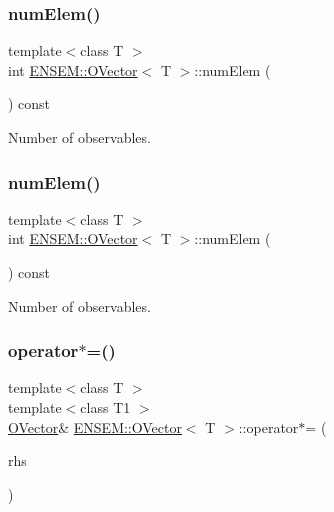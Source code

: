 \subsubsection{\texorpdfstring{numElem()}{numElem()}\hspace{0.1cm}{\footnotesize\ttfamily [2/3]}}
{\footnotesize\ttfamily template$<$class T $>$ \\
int \mbox{\hyperlink{classENSEM_1_1OVector}{E\+N\+S\+E\+M\+::\+O\+Vector}}$<$ T $>$\+::num\+Elem (\begin{DoxyParamCaption}{ }\end{DoxyParamCaption}) const\hspace{0.3cm}{\ttfamily [inline]}}



Number of observables. 

\mbox{\label{classENSEM_1_1OVector_a77771968912766dab2f1bd6ed7ccc876}} 
\subsubsection{\texorpdfstring{numElem()}{numElem()}\hspace{0.1cm}{\footnotesize\ttfamily [3/3]}}
{\footnotesize\ttfamily template$<$class T $>$ \\
int \mbox{\hyperlink{classENSEM_1_1OVector}{E\+N\+S\+E\+M\+::\+O\+Vector}}$<$ T $>$\+::num\+Elem (\begin{DoxyParamCaption}{ }\end{DoxyParamCaption}) const\hspace{0.3cm}{\ttfamily [inline]}}



Number of observables. 

\mbox{\label{classENSEM_1_1OVector_a55710cffaf6c877d2465af80ad8b6c49}} 
\subsubsection{\texorpdfstring{operator$\ast$=()}{operator*=()}\hspace{0.1cm}{\footnotesize\ttfamily [1/6]}}
{\footnotesize\ttfamily template$<$class T $>$ \\
template$<$class T1 $>$ \\
\mbox{\hyperlink{classENSEM_1_1OVector}{O\+Vector}}\& \mbox{\hyperlink{classENSEM_1_1OVector}{E\+N\+S\+E\+M\+::\+O\+Vector}}$<$ T $>$\+::operator$\ast$= (\begin{DoxyParamCaption}\item[{const \mbox{\hyperlink{classENSEM_1_1OScalar}{O\+Scalar}}$<$ T1 $>$ \&}]{rhs }\end{DoxyParamCaption})\hspace{0.3cm}{\ttfamily [inline]}}



